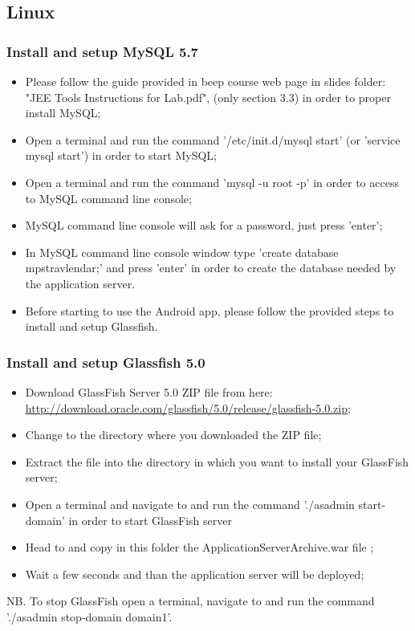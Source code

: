 \subsection{Linux}
\label{subsect:Linux}

\subsubsection{Install and setup MySQL 5.7}
\begin{itemize}
	\item Please follow the guide provided in beep course web page in slides folder: "JEE Tools Instructions for Lab.pdf", (only section 3.3) in order to proper install MySQL;
	\item Open a terminal and run the command '/etc/init.d/mysql start' (or 'service mysql start') in order to start MySQL;
	\item Open a terminal and run the command 'mysql -u root -p' in order to access to MySQL command line console;
	\item MySQL command line console will ask for a password, just press 'enter';
	\item In MySQL command line console window type 'create database mps\textunderscore travlendar;' and press 'enter' in order to create the database needed by the application server.
	\item Before starting to use the Android app, please follow the provided steps to install and setup Glassfish.
\end{itemize}

\subsubsection{Install and setup Glassfish 5.0}
\begin{itemize}
	\item Download GlassFish Server 5.0 ZIP file from here: \\ \href{http://download.oracle.com/glassfish/5.0/release/glassfish-5.0.zip}{\color{blue}http://download.oracle.com/glassfish/5.0/release/glassfish-5.0.zip};
	\item Change to the directory where you downloaded the ZIP file;
	\item Extract the file into the directory in which you want to install your GlassFish server;
	\item Open a terminal and navigate to  and run the command './asadmin start-domain' in order to start GlassFish server
	\item Head to  and copy in this folder the ApplicationServerArchive.war file ;
	\item Wait a few seconds and than the application server will be deployed;
\end{itemize}
NB. To stop GlassFish open a terminal, navigate to  and run the command './asadmin stop-domain domain1'.

